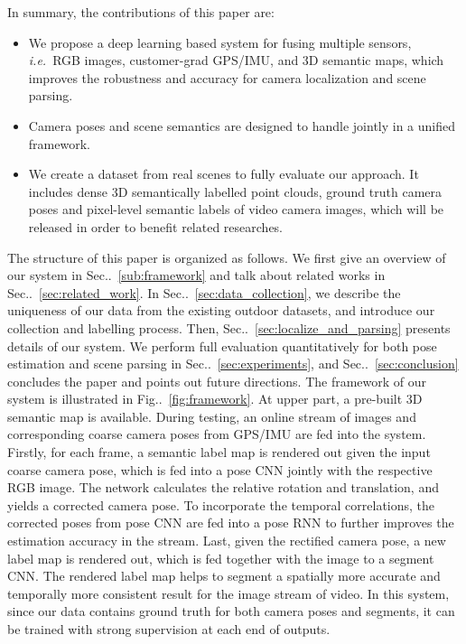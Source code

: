 \documentclass[10pt,twocolumn,letterpaper]{article}
\makeatletter
\newcommand{\figref}[1]{Fig\onedot~\ref{#1}}
\newcommand{\secref}[1]{Sec\onedot~\ref{#1}}
\DeclareRobustCommand\onedot{\futurelet\@let@token\@onedot}
\def\onedot{\ifx\@let@token.\else.\null\fi\xspace}
\def\ie{\emph{i.e.}}
\makeatother
\begin{document}
In summary, the contributions of this paper are:
\begin{itemize}
\vspace{-0.5\baselineskip}
    \setlength{\itemsep}{-2pt}
    \item We propose a deep learning based system for fusing multiple sensors, \ie~RGB images, customer-grad GPS/IMU, and 3D semantic maps, which improves the robustness and accuracy for camera localization and scene parsing.
    \item Camera poses and scene semantics are designed to handle jointly in a unified framework.
    \item We create a dataset from real scenes to fully evaluate our approach. It includes dense 3D semantically labelled point clouds, ground truth camera poses and pixel-level semantic labels of video camera images, which will be released in order to benefit related researches.
\vspace{-0.4\baselineskip}
\end{itemize}

The structure of this paper is organized as follows. We first give an overview of our system in \secref{sub:framework} and talk about related works in \secref{sec:related_work}. In \secref{sec:data_collection}, we describe the uniqueness of our data from the existing outdoor datasets, and introduce our collection and labelling process. 
Then, \secref{sec:localize_and_parsing} presents details of our system. We perform full evaluation quantitatively for both pose estimation and scene parsing in \secref{sec:experiments}, and \secref{sec:conclusion} concludes the paper and points out future directions. %
The framework of our system is illustrated in \figref{fig:framework}. At upper part, a pre-built 3D semantic map is available. During testing, an online stream of images and corresponding coarse camera poses from GPS/IMU are fed into the system. Firstly, for each frame, a semantic label map is rendered out given the input coarse camera pose, which is fed into a pose CNN jointly with the respective RGB image.  The network calculates the relative rotation and translation, and yields a corrected camera pose. To incorporate the temporal correlations, the corrected poses from pose CNN are fed into a pose RNN to further improves the estimation accuracy in the stream.
Last, given the rectified camera pose, a new label map is rendered out, which is fed together with the image to a segment CNN. The rendered label map helps to segment a spatially more accurate and temporally more consistent result for the image stream of video.
In this system, since our data contains ground truth for both camera poses and segments, it can be trained with strong supervision at each end of outputs.
\end{document}
